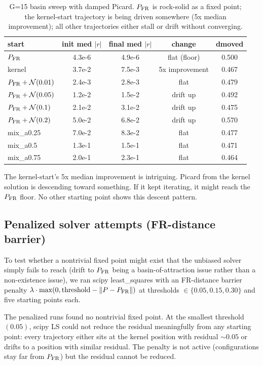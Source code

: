 \documentclass[11pt]{article}
\newcommand{\1}{\mathbf{1}}
\newcommand{\PFR}{P_{\rm FR}}
\begin{document}
\begin{table}[H]\centering\small
\begin{tabular}{lcccc}
\toprule
start & init med $|r|$ & final med $|r|$ & change & dmoved \\
\midrule
$\PFR$ & 4.3e-6 & 4.9e-6 & flat (floor) & 0.500\\
kernel & 3.7e-2 & 7.5e-3 & 5x improvement & 0.467\\
$\PFR + \mathcal{N}(0.01)$ & 2.4e-3 & 2.8e-3 & flat & 0.479\\
$\PFR + \mathcal{N}(0.05)$ & 1.2e-2 & 1.5e-2 & drift up & 0.492\\
$\PFR + \mathcal{N}(0.1)$ & 2.1e-2 & 3.1e-2 & drift up & 0.475\\
$\PFR + \mathcal{N}(0.2)$ & 5.0e-2 & 6.8e-2 & drift up & 0.570\\
mix\_a0.25 & 7.0e-2 & 8.3e-2 & flat & 0.477\\
mix\_a0.5 & 1.3e-1 & 1.5e-1 & flat & 0.471\\
mix\_a0.75 & 2.0e-1 & 2.3e-1 & flat & 0.464\\
\bottomrule
\end{tabular}
\caption{G=15 basin sweep with damped Picard.  $\PFR$ is rock-solid as
a fixed point; the kernel-start trajectory is being driven somewhere
(5x median improvement); all other trajectories either stall or drift
without converging.}
\end{table}

The kernel-start's 5x median improvement is intriguing.  Picard from
the kernel solution is descending toward something.  If it kept
iterating, it might reach the $\PFR$ floor.  No other starting point
shows this descent pattern.

\subsection{Penalized solver attempts (FR-distance barrier)}

To test whether a nontrivial fixed point might exist that the unbiased
solver simply fails to reach (drift to $\PFR$ being a basin-of-attraction
issue rather than a non-existence issue), we ran scipy
least\_squares with an FR-distance barrier penalty $\lambda \cdot
\max(0, \mathrm{threshold} - \|P - \PFR\|)$ at thresholds $\in \{0.05,
0.15, 0.30\}$ and five starting points each.

The penalized runs found no nontrivial fixed point.  At the smallest
threshold $(0.05)$, scipy LS could not reduce the residual meaningfully
from any starting point: every trajectory either sits at the kernel
position with residual $\sim 0.05$ or drifts to a position with similar
residual.  The penalty is not active (configurations stay far from
$\PFR$) but the residual cannot be reduced.
\end{document}
